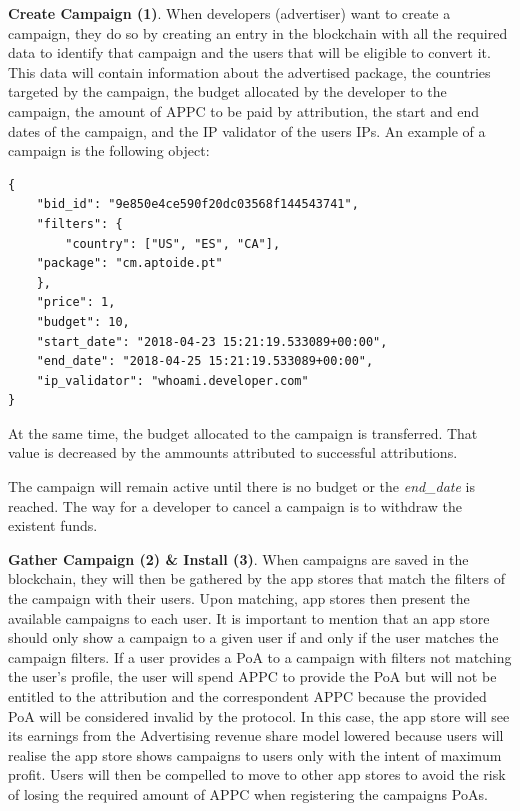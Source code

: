 \noindent \textbf{Create Campaign (1)}. When developers (advertiser) want to create a campaign, they do so by creating an entry in the blockchain with all the required data to identify that campaign and the users that will be eligible to convert it. This data will contain information about the advertised package, the countries targeted by the campaign, the budget allocated by the developer to the campaign, the amount of APPC to be paid by attribution, the start and end dates of the campaign, and the IP validator of the users IPs. An example of a campaign is the following object:
\begin{tcolorbox}[enhanced jigsaw,sharp corners, drop fuzzy shadow=ShadowColor]
\begin{lstlisting}[xleftmargin=0.05\textwidth]
{
    "bid_id": "9e850e4ce590f20dc03568f144543741",
    "filters": {
        "country": ["US", "ES", "CA"],
	"package": "cm.aptoide.pt"
    },
    "price": 1,
    "budget": 10,
    "start_date": "2018-04-23 15:21:19.533089+00:00",
    "end_date": "2018-04-25 15:21:19.533089+00:00",
    "ip_validator": "whoami.developer.com"
}
\end{lstlisting}
\end{tcolorbox}

At the same time, the budget allocated to the campaign is transferred. That value is decreased by the ammounts attributed to successful attributions. 

The campaign will remain active until there is no budget or the {\em end\_date} is reached. The way for a developer to cancel a campaign is to withdraw the existent funds. 


\noindent \textbf{Gather Campaign (2) \& Install (3)}. When campaigns are saved in the blockchain, they will then be gathered by the app stores that match the filters of the campaign with their users. Upon matching, app stores then present the available campaigns to each user. It is important to mention that an app store should only show a campaign to a given user if and only if the user matches the campaign filters. If a user provides a \textsf{PoA} to a campaign with filters not matching the user's profile, the user will spend APPC to provide the \textsf{PoA} but will not be entitled to the attribution and the correspondent APPC because the provided \textsf{PoA} will be considered invalid by the protocol. In this case, the app store will see its earnings from the Advertising revenue share model lowered because users will realise the app store shows campaigns to users only with the intent of maximum profit. Users will then be compelled to move to other app stores to avoid the risk of losing the required amount of APPC when registering the campaigns \textsf{PoAs}.\\

